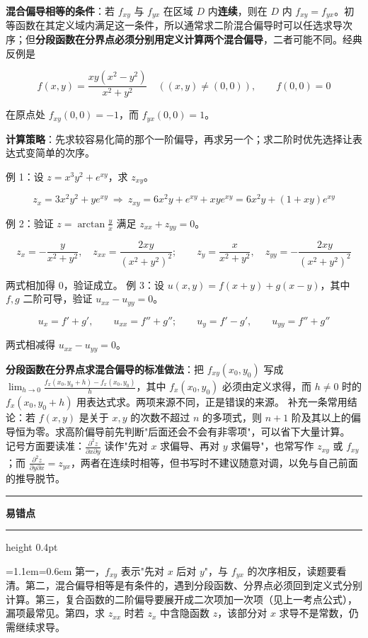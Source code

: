 \documentclass[11pt,openany,UTF8]{ctexbook}
\newcommand{\callouthead}[2]{%
  \par\addvspace{7pt}\noindent
  {\color{#1}\rule[-0.15em]{3pt}{1.05em}}\hspace{0.5em}%
  {\bfseries\color{#1}#2}\par\nobreak\vspace{-0.35em}%
  {\color{rulesep}\hrule height 0.4pt}\nobreak\vspace{0.45em}%
  \begingroup\small\setlength{\parindent}{0pt}%
  \leftskip=1.1em\rightskip=0.6em\noindent\ignorespaces}
\newcommand{\calloutend}{\par\endgroup\addvspace{7pt}}
\newenvironment{callwarn}[1]{\callouthead{warnbar}{#1}}{\calloutend}
\begin{document}
\textbf{混合偏导相等的条件}：若 $f_{xy}$ 与 $f_{yx}$ 在区域 $D$ 内\textbf{连续}，则在 $D$ 内 $f_{xy}=f_{yx}$。初等函数在其定义域内满足这一条件，所以通常求二阶混合偏导时可以任选求导次序；但\textbf{分段函数在分界点必须分别用定义计算两个混合偏导}，二者可能不同。经典反例是

\[f(x,y)=\frac{xy(x^{2}-y^{2})}{x^{2}+y^{2}}\quad((x,y)\ne(0,0)),\qquad f(0,0)=0\]

在原点处 $f_{xy}(0,0)=-1$，而 $f_{yx}(0,0)=1$。

\textbf{计算策略}：先求较容易化简的那个一阶偏导，再求另一个；求二阶时优先选择让表达式变简单的次序。

例 1：设 $z=x^{3}y^{2}+e^{xy}$，求 $z_{xy}$。

\[z_x=3x^{2}y^{2}+ye^{xy}\ \Longrightarrow\ z_{xy}=6x^{2}y+e^{xy}+xye^{xy}=6x^{2}y+(1+xy)e^{xy}\]

例 2：验证 $z=\arctan\frac{y}{x}$ 满足 $z_{xx}+z_{yy}=0$。

\[z_x=-\frac{y}{x^{2}+y^{2}},\quad z_{xx}=\frac{2xy}{(x^{2}+y^{2})^{2}};\qquad z_y=\frac{x}{x^{2}+y^{2}},\quad z_{yy}=-\frac{2xy}{(x^{2}+y^{2})^{2}}\]

两式相加得 $0$，验证成立。 例 3：设 $u(x,y)=f(x+y)+g(x-y)$，其中 $f,g$ 二阶可导，验证 $u_{xx}-u_{yy}=0$。

\[u_x=f'+g',\qquad u_{xx}=f''+g'';\qquad u_y=f'-g',\qquad u_{yy}=f''+g''\]

两式相减得 $u_{xx}-u_{yy}=0$。

\textbf{分段函数在分界点求混合偏导的标准做法}：把 $f_{xy}(x_0,y_0)$ 写成 $\lim_{h\to 0}\frac{f_x(x_0,y_0+h)-f_x(x_0,y_0)}{h}$，其中 $f_x(x_0,y_0)$ 必须由定义求得，而 $h\ne 0$ 时的 $f_x(x_0,y_0+h)$ 用表达式求。两项来源不同，正是错误的来源。 补充一条常用结论：若 $f(x,y)$ 是关于 $x,y$ 的次数不超过 $n$ 的多项式，则 $n+1$ 阶及其以上的偏导恒为零。求高阶偏导前先判断"后面还会不会有非零项"，可以省下大量计算。 记号方面要读准：$\frac{\partial^{2}z}{\partial x\partial y}$ 读作"先对 $x$ 求偏导、再对 $y$ 求偏导"，也常写作 $z_{xy}$ 或 $f_{xy}$；而 $\frac{\partial^{2}z}{\partial y\partial x}=z_{yx}$，两者在连续时相等，但书写时不建议随意对调，以免与自己前面的推导脱节。

\begin{callwarn}{易错点}
第一，$f_{xy}$ 表示"先对 $x$ 后对 $y$"，与 $f_{yx}$ 的次序相反，读题要看清。第二，混合偏导相等是有条件的，遇到分段函数、分界点必须回到定义式分别计算。第三，复合函数的二阶偏导要展开成二次项加一次项（见上一考点公式），漏项最常见。第四，求 $z_{xx}$ 时若 $z_x$ 中含隐函数 $z$，该部分对 $x$ 求导不是常数，仍需继续求导。

\end{callwarn}
\end{document}
